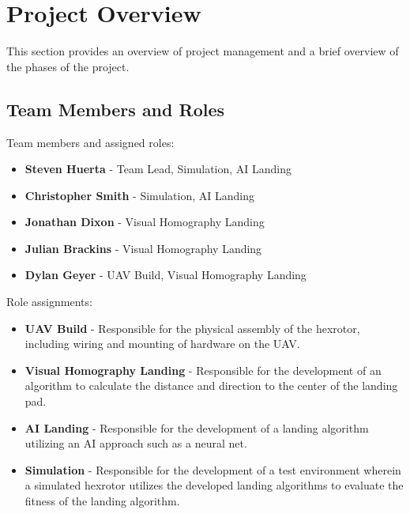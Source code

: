 

\chapter{Project Overview}
This section provides an overview of project management and a brief overview of the phases of the project.



\section{Team Members and Roles}
Team members and assigned roles:
\begin{itemize}
\item \textbf{Steven Huerta} - Team Lead, Simulation, AI Landing
\item \textbf{Christopher Smith} - Simulation, AI Landing
\item \textbf{Jonathan Dixon} - Visual Homography Landing
\item \textbf{Julian Brackins} - Visual Homography Landing
\item \textbf{Dylan Geyer} - UAV Build, Visual Homography Landing
\end{itemize}

\noindent Role assignments:
\begin{itemize}
\item \textbf{UAV Build} - Responsible for the physical assembly of the hexrotor, including wiring and mounting of hardware on the UAV.
\item \textbf{Visual Homography Landing} - Responsible for the development of an algorithm to calculate the distance and direction to the center of the landing pad. 
\item \textbf{AI Landing} - Responsible for the development of a landing algorithm utilizing an AI approach such as a neural net.
\item \textbf{Simulation} - Responsible for the development of a test environment wherein a simulated hexrotor utilizes the developed landing algorithms to evaluate the fitness of the landing algorithm.  
\end{itemize}



